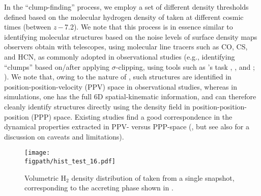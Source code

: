 \documentclass[iop]{emulateapj} %
\begin{document}
In the ``clump-finding'' process, we employ a set of different density thresholds defined based on the
molecular hydrogen density of \flower taken at different cosmic times (between $z$\,$-$\,7.2).
We note that this process is in essence similar to
identifying molecular structures based on the noise levels of surface density maps
observers obtain with telescopes, using molecular line tracers such as CO, CS, and HCN,
as commonly adopted in observational studies (e.g., identifying
``clumps'' based on/after applying $\sigma$-clipping,
using tools such as 's task , ,
and ; \citealt{Williams94a, Oka01a, Rosolowsky06a}).
We note that, owing to the nature of \obs, such structures are identified 
in position-position-velocity (PPV) space in observational studies, whereas in simulations, one has the 
full 6D spatial-kinematic information, and can therefore cleanly identify structures directly using the density field in position-position-position (PPP) space.
Existing studies find a good correspondence in the dynamical properties extracted in
PPV- versus PPP-space (\citealt{Ballesteros-Paredes02a, Heitsch09a, Shetty10a, Beaumont13a, 
Pan15a, Ibanez-Mejia16a}, but see also \citealt{Shetty10a} for a discussion on caveats and limitations). 


\begin{figure}[htbp]
\centering
\texttt{[image: \\figpath/hist\_test\_16.pdf]}
\caption{
Volumetric H$_2$ density distribution of \flower taken from a single snapshot, corresponding to the 
accreting phase shown in .
\label{fig:h2density}}
\end{figure}
\end{document}
